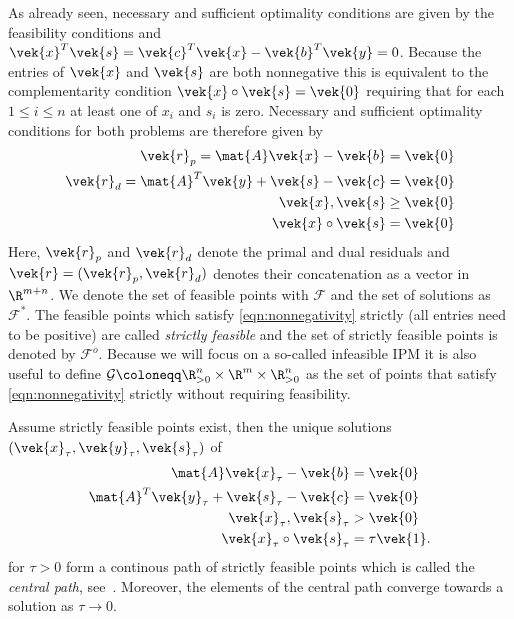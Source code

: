 As already seen, necessary and sufficient optimality conditions are given by the feasibility conditions and \(\vek{x}^T \vek{s} = \vek{c}^T \vek{x} - \vek{b}^T \vek{y} = 0\).
Because the entries of \(\vek{x}\) and \(\vek{s}\) are both nonnegative this is equivalent to the complementarity condition \(\vek{x} \circ \vek{s} = \vek{0}\) requiring that for each \(1 \leq i \leq n\) at least one of \(x_i\) and \(s_i\) is zero.
Necessary and sufficient optimality conditions for both problems are therefore given by
\begin{subequations}\label{eqn:optimality-conditions}
  \begin{align}
    \label{eqn:primal-feasibility}
    \vek{r}_p = \mat{A}\vek{x} - \vek{b} &= \vek{0} \\
    \label{eqn:dual-feasibility}
    \vek{r}_d = \mat{A}^T \vek{y} + \vek{s} - \vek{c} &= \vek{0} \\
    \label{eqn:nonnegativity}
    \vek{x}, \vek{s} &\geq \vek{0} \\
    \label{eqn:complementarity}
    \vek{x} \circ \vek{s} &= \vek{0}
  \end{align}
\end{subequations}
Here, \(\vek{r}_p\) and \(\vek{r}_d\) denote the primal and dual residuals and \(\vek{r} = (\vek{r}_p, \vek{r}_d)\) denotes their concatenation as a vector in \(\R^{m+n}\).
We denote the set of feasible points with \(\mathcal{F}\) and the set of solutions as \(\mathcal{F}^*\).
The feasible points which satisfy \cref{eqn:nonnegativity} strictly (all entries need to be positive) are called \emph{strictly feasible} and the set of strictly feasible points is denoted by \(\mathcal{F}^o\).
Because we will focus on a so-called infeasible IPM it is also useful to define \(\mathcal{G} \coloneqq \R^n_{>0} \times \R^m \times \R^n_{>0}\) as the set of points that satisfy \cref{eqn:nonnegativity} strictly without requiring feasibility.

Assume strictly feasible points exist, then the unique solutions \((\vek{x}_\tau, \vek{y}_\tau, \vek{s}_\tau)\) of
\begin{subequations}
  \begin{align}
    \mat{A}\vek{x}_\tau - \vek{b} &= \vek{0} \\
    \mat{A}^T \vek{y}_\tau + \vek{s}_\tau - \vek{c} &= \vek{0} \\
    \vek{x}_\tau, \vek{s}_\tau &> \vek{0} \label{eqn:strict-nonnegativity} \\
    \vek{x}_\tau \circ \vek{s}_\tau &= \tau \vek{1}.
  \end{align}
\end{subequations}
for \(\tau > 0\) form a continous path of strictly feasible points which is called the \emph{central path}, see~\cite[Theorem 2.8]{Wright-PrimalDualInteriorPointMethods}.
Moreover, the elements of the central path converge towards a solution as \(\tau \to 0\).

